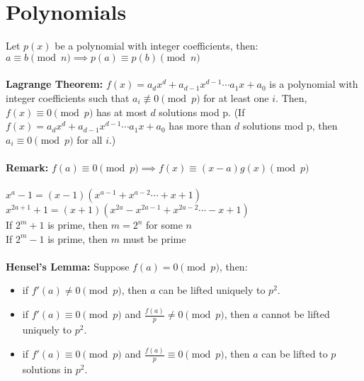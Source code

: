 \documentclass[12pt]{article}
\begin{document}
\section*{Polynomials}
Let $p(x)$ be a polynomial with integer coefficients, then:\\
$a\equiv  b\pmod n \implies p(a)\equiv  p(b)\pmod n$\\
\\
\textbf{Lagrange Theorem:} $f(x)=a_dx^d+a_{d-1}x^{d-1}\cdots a_1x+a_0$ is a polynomial with integer coefficients such that $a_i\not\equiv 0\pmod p$ for at least one $i$. Then, $f(x)\equiv  0\pmod p$ has at most $d$ solutions mod p. (If $f(x)=a_dx^d+a_{d-1}x^{d-1}\cdots a_1x+a_0$ has more than $d$ solutions mod p, then $a_i\equiv 0\pmod p$ for all $i$.)\\
\\
\textbf{Remark:} $f(a)\equiv 0\pmod p \implies f(x)\equiv (x-a)g(x)\pmod p$\\
\\
$x^a-1=(x-1)(x^{a-1}+x^{a-2}\cdots+x+1)$\\
$x^{2a+1}+1=(x+1)(x^{2a}-x^{2a-1}+x^{2a-2}\cdots-x+1)$\\
If $2^m+1$ is prime, then $m=2^n$ for some $n$\\
If $2^m-1$ is prime, then $m$ must be prime\\
\\
\textbf{Hensel's Lemma:} Suppose $f(a)=0\pmod p$, then:
\begin{itemize}
    \setlength\itemsep{0em}
    \item if $f'(a)\neq 0\pmod p$, then $a$ can be lifted uniquely to $p^2$.
    \item if $f'(a)\equiv 0\pmod p$ and $\frac{f(a)}{p}\neq 0\pmod p$, then $a$ cannot be lifted uniquely to $p^2$.
    \item if $f'(a)\equiv 0\pmod p$ and $\frac{f(a)}{p}\equiv  0\pmod p$, then $a$ can be lifted to $p$ solutions in $p^2$.
\end{itemize}


\end{document}
